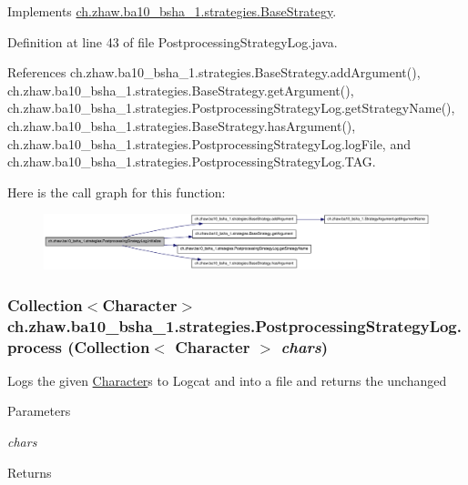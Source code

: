 Implements \hyperlink{classch_1_1zhaw_1_1ba10__bsha__1_1_1strategies_1_1BaseStrategy_af6ea27835befac71906915236a347450}{ch.zhaw.ba10\_\-bsha\_\-1.strategies.BaseStrategy}.

Definition at line 43 of file PostprocessingStrategyLog.java.

References ch.zhaw.ba10\_\-bsha\_\-1.strategies.BaseStrategy.addArgument(), ch.zhaw.ba10\_\-bsha\_\-1.strategies.BaseStrategy.getArgument(), ch.zhaw.ba10\_\-bsha\_\-1.strategies.PostprocessingStrategyLog.getStrategyName(), ch.zhaw.ba10\_\-bsha\_\-1.strategies.BaseStrategy.hasArgument(), ch.zhaw.ba10\_\-bsha\_\-1.strategies.PostprocessingStrategyLog.logFile, and ch.zhaw.ba10\_\-bsha\_\-1.strategies.PostprocessingStrategyLog.TAG.

Here is the call graph for this function:\nopagebreak
\begin{figure}[H]
\begin{center}
\leavevmode
\includegraphics[width=420pt]{classch_1_1zhaw_1_1ba10__bsha__1_1_1strategies_1_1PostprocessingStrategyLog_af34bf152422d8a8ebc3540f317764e65_cgraph}
\end{center}
\end{figure}
\hypertarget{classch_1_1zhaw_1_1ba10__bsha__1_1_1strategies_1_1PostprocessingStrategyLog_a284bd1d88fb08a15ec240911d11d23c9}{
\subsubsection[{process}]{\setlength{\rightskip}{0pt plus 5cm}Collection$<${\bf Character}$>$ ch.zhaw.ba10\_\-bsha\_\-1.strategies.PostprocessingStrategyLog.process (Collection$<$ {\bf Character} $>$ {\em chars})}}
\label{classch_1_1zhaw_1_1ba10__bsha__1_1_1strategies_1_1PostprocessingStrategyLog_a284bd1d88fb08a15ec240911d11d23c9}
Logs the given \hyperlink{classch_1_1zhaw_1_1ba10__bsha__1_1_1Character}{Character}s to Logcat and into a file and returns the unchanged


\begin{DoxyParams}{Parameters}
\item[{\em chars}]\end{DoxyParams}
\begin{DoxyReturn}{Returns}

\end{DoxyReturn}


